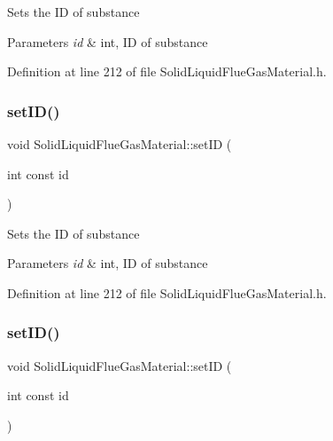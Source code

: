 Sets the ID of substance 
\begin{DoxyParams}{Parameters}
{\em id} & int, ID of substance \\
\hline
\end{DoxyParams}


Definition at line 212 of file Solid\+Liquid\+Flue\+Gas\+Material.\+h.

\mbox{\label{class_solid_liquid_flue_gas_material_a6046d06703bd496745121b62eab4f40f}} 
\subsubsection{\texorpdfstring{set\+I\+D()}{setID()}\hspace{0.1cm}{\footnotesize\ttfamily [2/3]}}
{\footnotesize\ttfamily void Solid\+Liquid\+Flue\+Gas\+Material\+::set\+ID (\begin{DoxyParamCaption}\item[{int const}]{id }\end{DoxyParamCaption})\hspace{0.3cm}{\ttfamily [inline]}}

Sets the ID of substance 
\begin{DoxyParams}{Parameters}
{\em id} & int, ID of substance \\
\hline
\end{DoxyParams}


Definition at line 212 of file Solid\+Liquid\+Flue\+Gas\+Material.\+h.

\mbox{\label{class_solid_liquid_flue_gas_material_a6046d06703bd496745121b62eab4f40f}} 
\subsubsection{\texorpdfstring{set\+I\+D()}{setID()}\hspace{0.1cm}{\footnotesize\ttfamily [3/3]}}
{\footnotesize\ttfamily void Solid\+Liquid\+Flue\+Gas\+Material\+::set\+ID (\begin{DoxyParamCaption}\item[{int const}]{id }\end{DoxyParamCaption})\hspace{0.3cm}{\ttfamily [inline]}}

